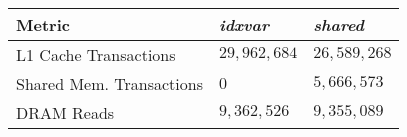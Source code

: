 \begin{table}
	\begin{tabular}{l l l}
		\hline
		Metric & \textbf{\emph{idxvar}} & \textbf{\emph{shared}} \\
		\hline
		L1 Cache Transactions & $29,962,684$ & $26,589,268$ \\
		Shared Mem. Transactions & $0$ & $5,666,573$ \\
		DRAM Reads & $9,362,526$ & $9,355,089$ \\

\end{tabular}
\end{table}
